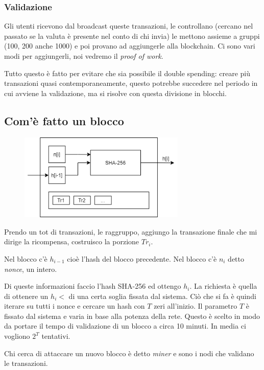 \subsubsection{Validazione}
Gli utenti ricevono dal broadcast queste transazioni, le controllano (cercano nel passato se la valuta è presente nel conto di chi invia) le mettono assieme a gruppi (100, 200 anche 1000) e poi provano ad aggiungerle alla blockchain.
Ci sono vari modi per aggiungerli, noi vedremo il \emph{proof of work}.

Tutto questo è fatto per evitare che sia possibile il double spending: creare più transazioni quasi contemporaneamente, questo potrebbe succedere nel periodo in cui avviene la validazione, ma si risolve con questa divisione in blocchi.

\subsection{Com'è fatto un blocco}

\begin{figure}[H]
    \centering
    \includegraphics[width=300px]{Bitcoin_1.png}
\end{figure}

Prendo un tot di transazioni, le raggruppo, aggiungo la transazione finale che mi dirige la ricompensa, costruisco la porzione $Tr_{i}$.

Nel blocco c'è $h_{i-1}$ cioè l'hash del blocco precedente. Nel blocco c'è $n_i$ detto \emph{nonce}, un intero.

Di queste informazioni faccio l'hash SHA-256 ed ottengo $h_i$. La richiesta è quella di ottenere un $h_i < $ di una certa soglia fissata dal sistema.
Ciò che si fa è quindi iterare su tutti i nonce e cercare un hash con $T$ zeri all'inizio.
Il parametro $T$ è fissato dal sistema e varia in base alla potenza della rete.
Questo è scelto in modo da portare il tempo di validazione di un blocco a circa 10 minuti.
In media ci vogliono $2^T$ tentativi.

Chi cerca di attaccare un nuovo blocco è detto \emph{miner} e sono i nodi che validano le transazioni.

